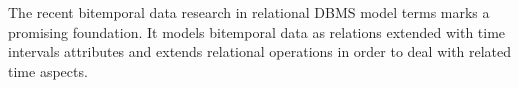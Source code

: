 The recent bitemporal data research in relational DBMS model terms
\cite{date02:_tempor_data_relat_model} marks a promising
foundation. It models bitemporal data as relations extended with time
intervals attributes and extends relational operations in order to
deal with related time aspects.











